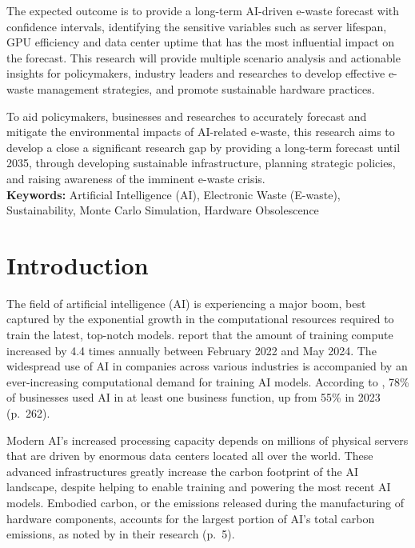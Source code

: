 \documentclass[a4paper, 12pt]{article}
\begin{document}
\par The expected outcome is to provide a long-term AI-driven e-waste forecast with confidence intervals, identifying the sensitive variables such as server lifespan, GPU efficiency and data center uptime that has the most influential impact on the forecast. This research will provide multiple scenario analysis and actionable insights for policymakers, industry leaders and researches to develop effective e-waste management strategies, and promote sustainable hardware practices. 
\par To aid policymakers, businesses and researches to accurately forecast and mitigate the environmental impacts of AI-related e-waste, this research aims to develop a close a significant research gap by providing a long-term forecast until 2035, through developing sustainable infrastructure, planning strategic policies, and raising awareness of the imminent e-waste crisis. \\

\textbf{Keywords:} Artificial Intelligence (AI), Electronic Waste (E-waste), Sustainability, Monte Carlo Simulation, Hardware Obsolescence

\section{Introduction}
The field of artificial intelligence (AI) is experiencing a major boom, best captured by the exponential growth in the computational resources required to train the latest, top-notch models. \citet{Sevilla_Roldan_2024} report that the amount of training compute increased by 4.4 times annually between February 2022 and May 2024. The widespread use of AI in companies across various industries is accompanied by an ever-increasing computational demand for training AI models. According to \citet{Maslej2025}, 78\% of businesses used AI in at least one business function, up from 55\% in 2023 (p.~262).

\par Modern AI's increased processing capacity depends on millions of physical servers that are driven by enormous data centers located all over the world.  These advanced infrastructures greatly increase the carbon footprint of the AI landscape, despite helping to enable training and powering the most recent AI models.  Embodied carbon, or the emissions released during the manufacturing of hardware components, accounts for the largest portion of AI's total carbon emissions, as noted by \citet{Wu2022} in their research (p.~5).
\end{document}
